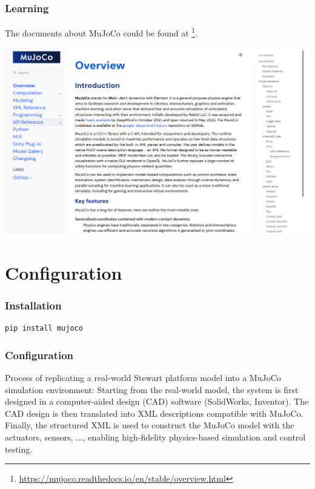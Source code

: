 \documentclass[9pt]{beamer}
\begin{document}
	\begin{frame}
		\frametitle{Learning}
		The documents about MuJoCo could be found at
		\footnote{\href{https://mujoco.readthedocs.io/en/stable/overview.html}{https://mujoco.readthedocs.io/en/stable/overview.html}}.
		\begin{center}
			\includegraphics[width=0.8\linewidth]{images/gg-mjc-overview}
		\end{center}
		
	\end{frame}


	
	
	\section{Configuration}
	\begin{frame}[fragile]
		\frametitle{Installation}
		\begin{verbatim}
pip install mujoco
		\end{verbatim}
	\end{frame}

	\begin{frame}
		\frametitle{Configuration}
		\begin{figure}
			\scalebox{0.6}{}
		\end{figure}
		
		Process of replicating a real-world Stewart platform model into a MuJoCo simulation environment: Starting from the real-world model, the system is first designed in a computer-aided design (CAD) software (SolidWorks, Inventor). The CAD design is then translated into XML descriptions compatible with MuJoCo. Finally, the structured XML is used to construct the MuJoCo model with the actuators, sensors, ..., enabling high-fidelity physics-based simulation and control testing.	
	\end{frame}
	
\end{document}
